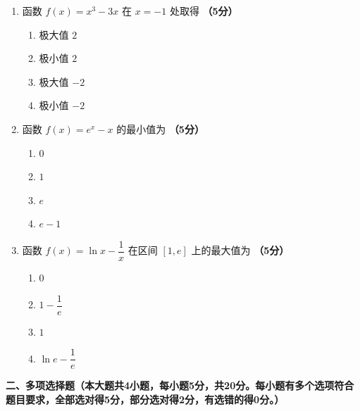 \documentclass[12pt, a4paper]{ctexart}
\newcommand{\score}[1]{\hfill\textbf{（#1分）}}
\begin{document}
\begin{enumerate}
\item 函数 $f(x)=x^3-3x$ 在 $x=-1$ 处取得 \score{5}
\begin{enumerate}[label=\Alph*.]
\item 极大值 $2$
\item 极小值 $2$
\item 极大值 $-2$
\item 极小值 $-2$
\end{enumerate}

\item 函数 $f(x)=e^x-x$ 的最小值为 \score{5}
\begin{enumerate}[label=\Alph*.]
\item $0$
\item $1$
\item $e$
\item $e-1$
\end{enumerate}

\item 函数 $f(x)=\ln x-\dfrac{1}{x}$ 在区间 $[1,e]$ 上的最大值为 \score{5}
\begin{enumerate}[label=\Alph*.]
\item $0$
\item $1-\dfrac{1}{e}$
\item $1$
\item $\ln e-\dfrac{1}{e}$
\end{enumerate}
\end{enumerate}

\vspace{1em}

\noindent\textbf{二、多项选择题（本大题共4小题，每小题5分，共20分。每小题有多个选项符合题目要求，全部选对得5分，部分选对得2分，有选错的得0分。）}

\vspace{0.5em}
\end{document}
